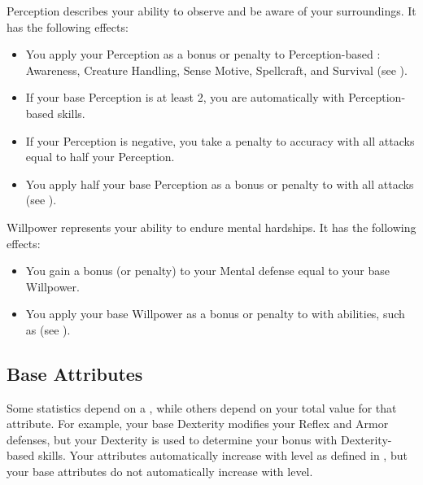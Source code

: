         \label{Perception}
        {
            Perception describes your ability to observe and be aware of your surroundings.
            It has the following effects:
            \begin{itemize}
                \item You apply your Perception as a bonus or penalty to Perception-based : Awareness, Creature Handling, Sense Motive, Spellcraft, and Survival (see ).
                \item If your base Perception is at least 2, you are automatically  with Perception-based skills.
                \item If your Perception is negative, you take a penalty to accuracy with all attacks equal to half your Perception.
                \item You apply half your base Perception as a bonus or penalty to  with all attacks (see ).
            \end{itemize}
        }

        \label{Willpower}
        {
            Willpower represents your ability to endure mental hardships.
            It has the following effects:
            \begin{itemize}
                \item You gain a bonus (or penalty) to your Mental defense equal to your base Willpower.
                \item You apply your base Willpower as a bonus or penalty to  with  abilities, such as  (see ).
            \end{itemize}
        }

    \subsection{Base Attributes}\label{Base Attributes}
        Some statistics depend on a , while others depend on your total value for that attribute.
        For example, your base Dexterity modifies your Reflex and Armor defenses, but your Dexterity is used to determine your bonus with Dexterity-based skills.
        Your attributes automatically increase with level as defined in , but your base attributes do not automatically increase with level.

